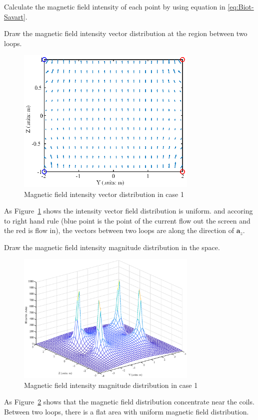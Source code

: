 \documentclass[10pt, journal, final]{IEEEtran}
\begin{document}
Calculate the magnetic field intensity of each point by using equation in \ref{eq:Biot-Savart}.


Draw the magnetic field intensity vector distribution at the region between two loops.


\begin{figure}[htbp]
    \centering
    \includegraphics[width = 3.4in]{figures-3/work1.1.eps}
    \caption{Magnetic field intensity vector distribution in case 1}
    \label{fig:1.1}
\end{figure}
As Figure~\ref{fig:1.1} shows the intensity vector field distribution is uniform. and accoring to right hand rule 
(blue point is the point of the current flow out the screen and the red is flow in),
the vectors between two loops are along the direction of $\mathbf{a}_z$.\\\par
Draw the magnetic field intensity magnitude distribution in the space.


\begin{figure}[htbp]
    \centering
    \includegraphics[width = 3.4in]{figures-3/work1.2.eps}
    \caption{Magnetic field intensity magnitude distribution in case 1}
    \label{fig:1.2}
\end{figure} 
As Figure~\ref{fig:1.2} shows that the magnetic field distribution concentrate near the coils.
Between two loops, there is a flat area with uniform magnetic field distribution.\\\par
\end{document}
